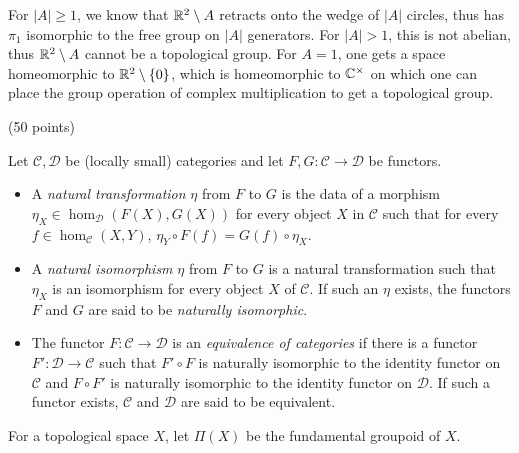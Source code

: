 \documentclass[12pt]{article}
\begin{document}
\begin{solution}
\begin{enumerate}
        For $|A| \geq 1$, we know that $\mathbb R^2 \setminus A$ retracts onto the wedge of $|A|$ circles, thus has $\pi_1$ isomorphic to the free group on $|A|$ generators. For $|A| > 1$, this is not abelian, thus $\mathbb R^2 \setminus A$ cannot be a topological group. For $A = 1$, one gets a space homeomorphic to $\mathbb R^2 \setminus \{0\}$, which is homeomorphic to $\mathbb C^\times$ on which one can place the group operation of complex multiplication to get a topological group. 
    \end{enumerate}
\end{solution}


\newpage


\begin{problem}{3} (50 points) 
    
    \begin{definition} Let $\mathcal{C}, \mathcal{D}$ be (locally small) categories and let $F, G: \mathcal{C} \to \mathcal{D}$ be functors. 
    \begin{itemize}

    \item A \emph{natural transformation} $\eta$ from $F$ to $G$ is the data of a morphism $\eta_X  \in \hom_{\mathcal{D}} (F(X), G(X))$ for every object $X$ in $\mathcal{C}$ such that for every $f \in \hom_\mathcal{C}(X,Y)$, $\eta_Y \circ F(f) = G(f) \circ \eta_X$. 

    \item A \emph{natural isomorphism} $\eta$ from $F$ to $G$ is a natural transformation such that $\eta_X$ is an isomorphism for every object $X$ of $\mathcal{C}$. If such an $\eta$ exists, the functors $F$ and $G$ are said to be \emph{naturally isomorphic}. 

    \item The functor $F:  \mathcal{C} \to \mathcal{D}$ is an \emph{equivalence of categories} if there is a functor $F':\mathcal{D} \to \mathcal{C}$ such that $F' \circ F$ is naturally isomorphic to the identity functor on $\mathcal{C}$ and $F \circ F'$ is naturally isomorphic to the identity functor on $\mathcal{D}$. If such a functor exists, $\mathcal{C}$ and $\mathcal{D}$ are said to be equivalent.
    \end{itemize}

    \end{definition}
    
    For a topological space $X$, let $\Pi(X)$ be the fundamental groupoid of $X$. 
    \begin{enumerate}
 

\end{enumerate}
\end{problem}
\end{document}
